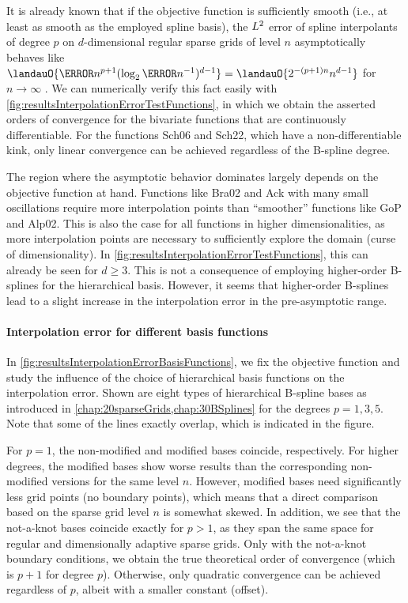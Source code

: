 It is already known that
if the objective function is sufficiently smooth
(i.e., at least as smooth as the employed spline basis),
the $L^2$ error of spline interpolants of degree $p$ on
$d$-dimensional regular sparse grids of level $n$
asymptotically behaves like
$\landauO{\ms{n}^{p+1} (\log_2 \ms{n}^{-1})^{d-1}}
= \landauO{2^{-(p+1)n} n^{d-1}}$ for $n \to \infty$ \cite{Sickel11Spline}.
We can numerically verify this fact easily with
\cref{fig:resultsInterpolationErrorTestFunctions},
in which we obtain the asserted orders of convergence
for the bivariate functions that are continuously differentiable.
For the functions Sch06 and Sch22, which have a non-differentiable kink,
only linear convergence can be achieved regardless of the B-spline degree.

The region where the asymptotic behavior dominates largely depends
on the objective function at hand.
Functions like Bra02 and Ack with many small oscillations
require more interpolation points than ``smoother'' functions like
GoP and Alp02.
This is also the case for all functions in higher dimensionalities,
as more interpolation points are necessary to sufficiently explore the domain
(curse of dimensionality).
In \cref{fig:resultsInterpolationErrorTestFunctions}, this can already be seen
for $d \ge 3$.
This is not a consequence of employing higher-order B-splines for
the hierarchical basis.
However, it seems that higher-order B-splines lead to a slight increase
in the interpolation error in the pre-asymptotic range.

\paragraph{Interpolation error for different basis functions}

In \cref{fig:resultsInterpolationErrorBasisFunctions},
we fix the objective function and study the influence of the choice
of hierarchical basis functions on the interpolation error.
Shown are eight types of hierarchical B-spline bases as introduced in
\cref{chap:20sparseGrids,chap:30BSplines} for the degrees $p = 1, 3, 5$.
Note that some of the lines exactly overlap, which is indicated in
the figure.

For $p = 1$, the non-modified and modified bases coincide,
respectively.
For higher degrees, the modified bases show worse results than
the corresponding non-modified versions for the same level $n$.
However, modified bases need significantly less grid points
(no boundary points),
which means that a direct comparison based on the sparse grid level $n$
is somewhat skewed.
%
In addition, we see that the not-a-knot bases coincide exactly for $p > 1$,
as they span the same space for regular and
dimensionally adaptive sparse grids.
Only with the not-a-knot boundary conditions, we obtain the true
theoretical order of convergence (which is $p + 1$ for degree $p$).
Otherwise, only quadratic convergence can be achieved regardless of $p$,
albeit with a smaller constant (offset).

